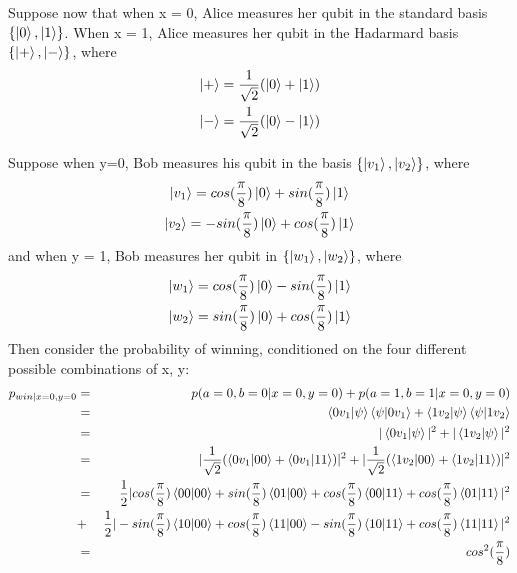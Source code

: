 Suppose now that when x = 0, Alice measures her qubit in the standard basis $\{\ket{0}, \ket{1}\}$. When x = 1, Alice measures her qubit in the Hadarmard basis $\{\ket{+}, \ket{-}\}$, where
\begin{gather*}
    \ket{+}=\frac{1}{\sqrt{2}}(\ket{0}+\ket{1})\\
    \ket{-}=\frac{1}{\sqrt{2}}(\ket{0}-\ket{1})
\end{gather*}

Suppose when y=0, Bob measures his qubit in the basis $\{\ket{v_1}, \ket{v_2}\}$, where
\begin{gather*}
    \ket{v_1}=cos(\frac{\pi}{8})\ket{0}+sin(\frac{\pi}{8})\ket{1}\\
    \ket{v_2}=-sin(\frac{\pi}{8})\ket{0}+cos(\frac{\pi}{8})\ket{1}  
\end{gather*}
and when y = 1, Bob measures her qubit in $\{\ket{w_1}, \ket{w_2}\}$, where
\begin{gather*}
    \ket{w_1}=cos(\frac{\pi}{8})\ket{0}-sin(\frac{\pi}{8})\ket{1}\\
    \ket{w_2}=sin(\frac{\pi}{8})\ket{0}+cos(\frac{\pi}{8})\ket{1}   
\end{gather*}
Then consider the probability of winning, conditioned on the four different possible combinations of x, y:
\begin{eqnarray*}
p_{win|x=0,y=0}&=&p(a=0, b=0|x=0, y=0)+p(a=1, b=1|x=0, y=0)\\
&=&\braket{0 v_1|\psi}\braket{\psi|0v_1}+\braket{1 v_2|\psi}\braket{\psi|1v_2}\\
&=&|\braket{0 v_1|\psi}|^2 + |\braket{1 v_2|\psi}|^2\\
&=&|\frac{1}{\sqrt{2}}(\braket{0v_1|00}+\braket{0v_1|11})|^2+|\frac{1}{\sqrt{2}}(\braket{1v_2|00}+\braket{1v_2|11})|^2\\
&=&\frac{1}{2}|cos(\frac{\pi}{8})\braket{00|00}+sin(\frac{\pi}{8})\braket{01|00}+cos(\frac{\pi}{8})\braket{00|11}+cos(\frac{\pi}{8})\braket{01|11}|^2\\
&+&\frac{1}{2}|-sin(\frac{\pi}{8})\braket{10|00}+cos(\frac{\pi}{8})\braket{11|00}-sin(\frac{\pi}{8})\braket{10|11}+cos(\frac{\pi}{8})\braket{11|11}|^2\\
&=&cos^2(\frac{\pi}{8})
\end{eqnarray*}

